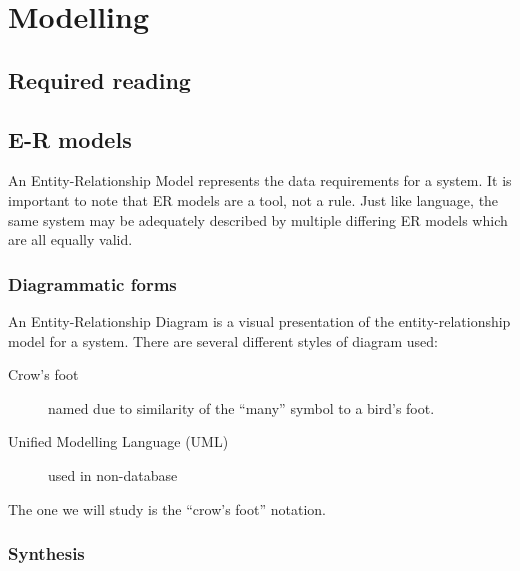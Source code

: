 \chapter{Modelling}

\section{Required reading}\label{required-reading}


\section{E-R models}\label{e-r-models}

An Entity-Relationship Model represents the data requirements for a
system. It is important to note that ER models are a tool, not a rule.
Just like language, the same system may be adequately described by
multiple differing ER models which are all equally valid.

\subsection{Diagrammatic forms}\label{diagrammatic-forms}

An Entity-Relationship Diagram is a visual presentation of the
entity-relationship model for a system. There are several different
styles of diagram used:

\begin{description}
\item[Crow's foot]
  named due to similarity of the ``many'' symbol to a bird's foot.
\item[Unified Modelling Language (UML)]
  used in non-database
\end{description}

The one we will study is the ``crow's foot'' notation.

\subsection{Synthesis}\label{synthesis}

